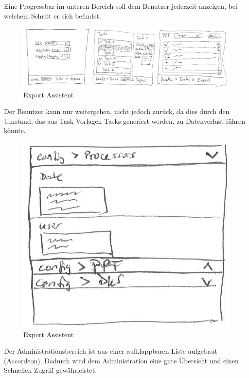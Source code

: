	Eine Progressbar im unteren Bereich soll dem Benutzer jederzeit anzeigen, bei welchem Schritt er sich befindet.
	
	\begin{figure}[H]
		\includegraphics[width=\linewidth]{interfacesAndProtocols/media/img/exportWorkflow.jpg}
		\caption{Export Assistent}
		\label{fig:exportAssistent}
	\end{figure}	
	
	Der Benutzer kann nur weitergehen, nicht jedoch zurück, da dies durch den Umstand, 
	das aus Task-Vorlagen Tasks generiert werden, 
	zu Datenverlust führen könnte.
	
	\begin{figure}[H]
		\centering
		\includegraphics[width=0.3\linewidth]{interfacesAndProtocols/media/img/administration.jpg}
		\caption{Export Assistent}
		\label{fig:administration}
	\end{figure}	
	
	Der Administrationsbereich ist aus einer aufklappbaren Liste aufgebaut (Accordeon). Dadurch wird dem Administration eine gute Übersicht und einen Schnellen Zugriff gewährleistet.